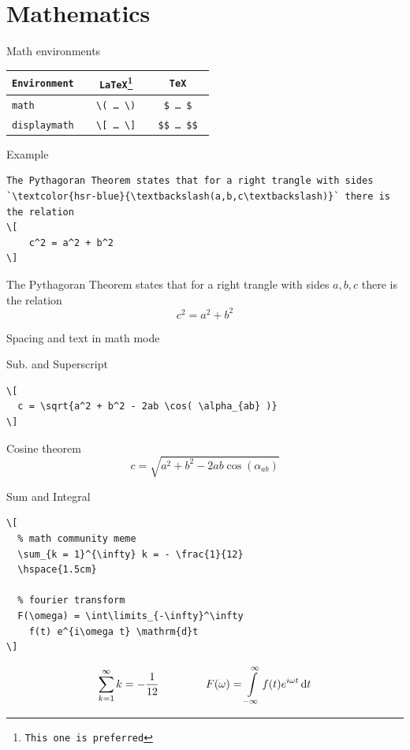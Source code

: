 \documentclass[xetex, onlymath]{beamer}
\begin{document}
\section{Mathematics}
\begin{frame}{Math environments}
\begin{table} \centering \Large
\begin{tabular}{>{\tt}l >{\tt}c >{\tt}c}
	\toprule
	\textsf{Environment} & \textrm{\LaTeX{}}\footnote{This one is preferred} & \textrm{\TeX} \\
	\midrule
	math & \textbackslash ( \ldots{} \textbackslash ) & \$ \ldots{} \$ \\
   displaymath & \textbackslash [ \ldots{} \textbackslash ] & \$\$ \ldots{} \$\$ \\
   \bottomrule
\end{tabular}
\end{table}
\end{frame}

\begin{frame}[fragile]{Example}
\begin{lstlisting}
The Pythagoran Theorem states that for a right trangle with sides `\textcolor{hsr-blue}{\textbackslash(a,b,c\textbackslash)}` there is the relation
\[
    c^2 = a^2 + b^2
\] 
\end{lstlisting}

\begin{exampleblock}{}
The Pythagoran Theorem states that for a right trangle with sides \(a, b, c\) there is the relation
\[
    c^2 = a^2 + b^2
\] 
\end{exampleblock}
\end{frame}

\begin{frame}{Spacing and text in math mode}
\end{frame}

\begin{frame}[fragile]{Sub. and Superscript}
\begin{lstlisting}
\[
  c = \sqrt{a^2 + b^2 - 2ab \cos( \alpha_{ab} )}
\]
\end{lstlisting}
\begin{exampleblock}{Cosine theorem}
\LARGE
\[
  c = \sqrt{ a^2 + b^2 - 2ab \cos( \alpha_{ab} ) }
\]
\end{exampleblock}
\end{frame}

\begin{frame}[fragile]{Sum and Integral}
\begin{lstlisting}
\[
  % math community meme
  \sum_{k = 1}^{\infty} k = - \frac{1}{12}
  \hspace{1.5cm}

  % fourier transform
  F(\omega) = \int\limits_{-\infty}^\infty 
    f(t) e^{i\omega t} \mathrm{d}t
\]
\end{lstlisting}
\begin{exampleblock}{}
\[
  \sum_{k = 1}^{\infty} k = - \frac{1}{12}
  \hspace{1.5cm}
  F(\omega) = \int\limits_{-\infty}^\infty f(t) e^{i\omega t} \,\mathrm{d}t
\]
\end{exampleblock}
\end{frame}
\end{document}

